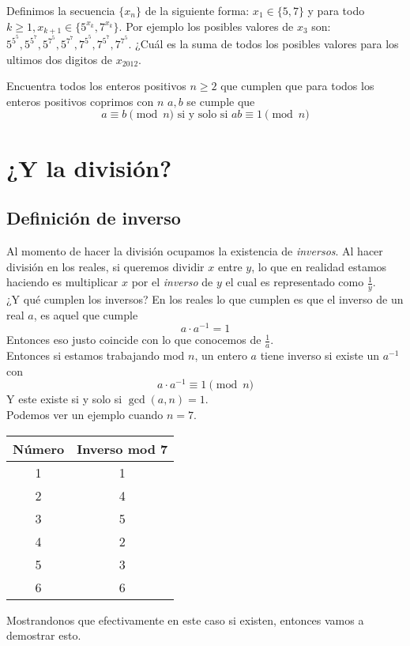 \documentclass[11pt]{scrartcl}
\newcommand{\thmdifficulty}{0}
\newcommand{\problemdiff}[1]{\renewcommand{\thmdifficulty}{#1}}
\begin{document}
\problemdiff{3.5}
\begin{problema}[PUMaC 2012 N A3]
Definimos la secuencia $\{x_n\}$ de la siguiente forma: $x_1 \in \{5,7\}$ y para todo $k\geq 1, x_{k+1} \in \{5^{x_k}, 7^{x_k}\}$. Por ejemplo los posibles valores de $x_3$ son: $5^{5^5}, 5^{5^7}, 5^{7^5}, 5^{7^7}, 7^{5^5}, 7^{5^7}, 7^{7^5}$. ¿Cu\'al es la suma de todos los posibles valores para los ultimos dos digitos de $x_{2012}$.
\end{problema}

\problemdiff{4}
\begin{problema}[IMOSL 2000 N1]
Encuentra todos los enteros positivos $n \geq 2$ que cumplen que para todos los enteros positivos coprimos con $n$ $a,b$ se cumple que 
\[a\equiv b \pmod n \text{ si y solo si } ab \equiv 1 \pmod n\]
\end{problema}


\newpage
\section{¿Y la divisi\'on?}
\subsection{Definici\'on de inverso}
Al momento de hacer la divisi\'on ocupamos la existencia de \textit{inversos}.  Al hacer divisi\'on en los reales, si queremos dividir $x$ entre $y$, lo que en realidad estamos haciendo es multiplicar $x$ por el \textit{inverso} de $y$ el cual es representado como $\frac 1y$.  \\

¿Y qu\'e cumplen los inversos? En los reales lo que cumplen es que el inverso de un real $a$, es aquel que cumple 
\[a \cdot a^{-1} = 1\]
Entonces eso justo coincide con lo que conocemos de $\frac 1a$. \\

Entonces si estamos trabajando mod $n$, un entero $a$ tiene inverso si existe un $a^{-1}$ con 
\[a \cdot a^{-1} \equiv  1 \pmod n \]
Y este existe si y solo si $\gcd(a,n)=1$.\\

Podemos ver un ejemplo cuando $n=7$.

\begin{center}
\begin{tabular}{|c|c|}
\hline
\textbf{Número} & \textbf{Inverso mod 7} \\
\hline
1 & 1 \\
2 & 4 \\
3 & 5 \\
4 & 2 \\
5 & 3 \\
6 & 6 \\
\hline
\end{tabular}
\end{center}
Mostrandonos que efectivamente en este caso si existen, entonces vamos a demostrar esto.
\end{document}
